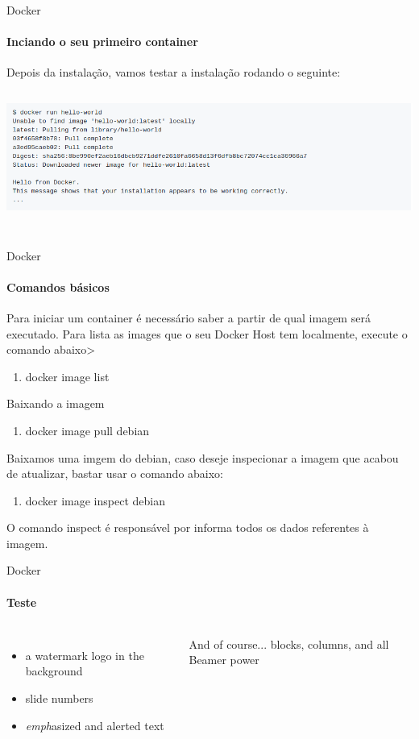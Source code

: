 \documentclass{beamer}
\begin{document}
\begin{frame}{Docker}
    \framesubtitle{Inciando o seu primeiro container}
    Depois da instala\c{c}\~ao, vamos testar a instala\c{c}\~ao rodando o seguinte:
    \includegraphics[height=5cm]{img/hello.png}
\end{frame}

\setwatermark{\fontsize{125pt}{125pt}\selectfont{Simple}}
\begin{frame}{Docker}
    \framesubtitle{Comandos básicos}
    Para iniciar um container \'e necess\'ario saber a partir de qual imagem será executado. Para lista as
    images que o seu Docker Host tem localmente, execute o comando abaixo>
    \begin{enumerate}
        \item  docker image list
    \end{enumerate}
    Baixando a imagem
    \begin{enumerate}
        \item docker image pull debian
    \end{enumerate}
    Baixamos uma imgem do debian, caso deseje inspecionar a imagem que acabou de atualizar, bastar usar o comando abaixo:
    \begin{enumerate}
        \item docker image inspect debian
    \end{enumerate}
    O comando inspect \'e respons\'avel por informa todos os dados referentes \`a imagem.
\end{frame}


\begin{frame}{Docker}
  \framesubtitle{Teste}
  \begin{columns}
      \begin{itemize}
        \item a \alert{watermark} logo in the background
        \item slide \alert{numbers}
        \item \emph{emph}asized and \alert{alert}ed text
      \end{itemize}

      \begin{block}{And of course...}
         blocks, columns, and all Beamer power
      \end{block}
  \end{columns}
\end{frame}
\end{document}
